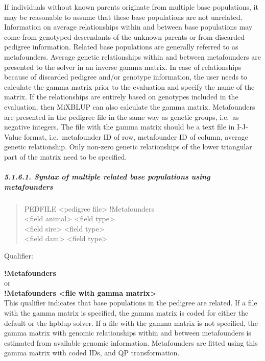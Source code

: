 If individuals without known parents originate from multiple base
populations, it may be reasonable to assume that these base populations
are not unrelated. Information on average relationships within and
between base populations may come from genotyped descendants of the
unknown parents or from discarded pedigree information. Related base
populations are generally referred to as metafounders. Average genetic
relationships within and between metafounders are presented to the
solver in an inverse gamma matrix. In case of relationships because of
discarded pedigree and/or genotype information, the user needs to
calculate the gamma matrix prior to the evaluation and specify the name
of the matrix. If the relationships are entirely based on genotypes
included in the evaluation, then MiXBLUP can also calculate the gamma
matrix. Metafounders are presented in the pedigree file in the same way
as genetic groups, i.e.~as negative integers. The file with the gamma
matrix should be a text file in I-J-Value format, i.e.~metafounder ID of
row, metafounder ID of column, average genetic relationship. Only
non-zero genetic relationships of the lower triangular part of the
matrix need to be specified.

\subparagraph{5.1.6.1. Syntax of multiple related base populations using
metafounders}\label{Gene19}

\begin{quote}
PEDFILE \textless pedigree file\textgreater{} !Metafounders\\
\textless field animal\textgreater{} \textless field
type\textgreater{}\\
\textless field sire\textgreater{} \textless field type\textgreater{}\\
\textless field dam\textgreater{} \textless field type\textgreater{}
\end{quote}

Qualifier:

\textbf{!Metafounders}\\
or\\
\textbf{!Metafounders \textless file with gamma matrix\textgreater{}}\\
This qualifier indicates that base populations in the pedigree are
related. If a file with the gamma matrix is specified, the gamma matrix
is coded for either the default or the hpblup solver. If a file with the
gamma matrix is not specified, the gamma matrix with genomic
relationships within and between metafounders is estimated from
available genomic information. Metafounders are fitted using this gamma
matrix with coded IDs, and QP transformation.

